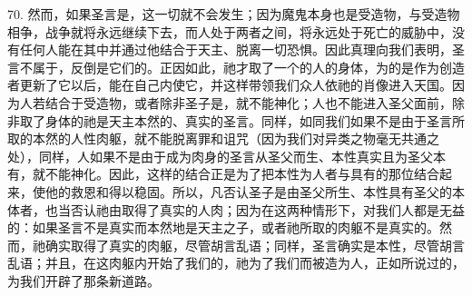 70. 然而，如果圣言是，这一切就不会发生；因为魔鬼本身也是受造物，与受造物相争，战争就将永远继续下去，而人处于两者之间，将永远处于死亡的威胁中，没有任何人能在其中并通过他结合于天主、脱离一切恐惧。因此真理向我们表明，圣言不属于，反倒是它们的。正因如此，祂才取了一个的人的身体，为的是作为创造者更新了它以后，能在自己内使它，并这样带领我们众人依祂的肖像进入天国。因为人若结合于受造物，或者除非圣子是，就不能神化；人也不能进入圣父面前，除非取了身体的祂是天主本然的、真实的圣言。同样，如同我们如果不是由于圣言所取的本然的人性肉躯，就不能脱离罪和诅咒（因为我们对异类之物毫无共通之处），同样，人如果不是由于成为肉身的圣言从圣父而生、本性真实且为圣父本有，就不能神化。因此，这样的结合正是为了把本性为人者与具有的那位结合起来，使他的救恩和得以稳固。所以，凡否认圣子是由圣父所生、本性具有圣父的本体者，也当否认祂由取得了真实的人肉；因为在这两种情形下，对我们人都是无益的：如果圣言不是真实而本然地是天主之子，或者祂所取的肉躯不是真实的。然而，祂确实取得了真实的肉躯，尽管胡言乱语；同样，圣言确实是本性，尽管胡言乱语；并且，在这肉躯内开始了我们的，祂为了我们而被造为人，正如所说过的，为我们开辟了那条新道路。\par

